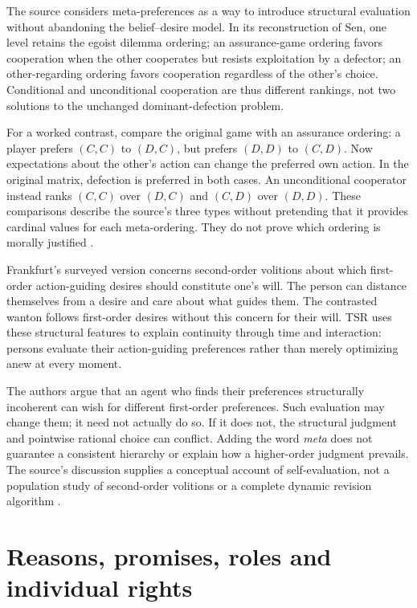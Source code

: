 The source considers meta-preferences as a way to introduce structural
evaluation without abandoning the belief--desire model. In its
reconstruction of Sen, one level retains the egoist dilemma ordering;
an assurance-game ordering favors cooperation when the other cooperates
but resists exploitation by a defector; an other-regarding ordering
favors cooperation regardless of the other's choice. Conditional and
unconditional cooperation are thus different rankings, not two solutions
to the unchanged dominant-defection problem.

For a worked contrast, compare the original game with an assurance
ordering: a player prefers \((C,C)\) to \((D,C)\), but prefers
\((D,D)\) to \((C,D)\). Now expectations about the other's action
can change the preferred own action. In the original matrix, defection
is preferred in both cases. An unconditional cooperator instead ranks
\((C,C)\) over \((D,C)\) and \((C,D)\) over \((D,D)\).
These comparisons describe the source's three types without pretending
that it provides cardinal values for each meta-ordering. They do not
prove which ordering is morally justified
\parencite[p.~627]{NidaRumelinGutwaldZuber2021}.

Frankfurt's surveyed version concerns second-order volitions about which
first-order action-guiding desires should constitute one's will. The
person can distance themselves from a desire and care about what guides
them. The contrasted wanton follows first-order desires without this
concern for their will. TSR uses these structural features to explain
continuity through time and interaction: persons evaluate their
action-guiding preferences rather than merely optimizing anew at every
moment.

The authors argue that an agent who finds their preferences structurally
incoherent can wish for different first-order preferences. Such evaluation
may change them; it need not actually do so. If it does not, the
structural judgment and pointwise rational choice can conflict. Adding
the word \emph{meta} does not guarantee a consistent hierarchy or
explain how a higher-order judgment prevails. The source's discussion
supplies a conceptual account of self-evaluation, not a population study
of second-order volitions or a complete dynamic revision algorithm
\parencite[p.~627]{NidaRumelinGutwaldZuber2021}.

\section{Reasons, promises, roles and individual rights}
\label{sec:p11-rat105-reasons}


